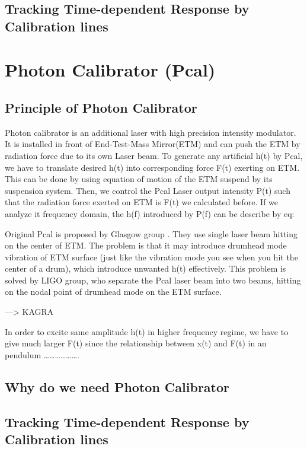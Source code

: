 \subsection{Tracking Time-dependent Response by Calibration lines}



\section{Photon Calibrator (Pcal)}
\subsection{Principle of Photon Calibrator}
Photon calibrator is an additional laser with high precision intensity modulator. It is installed in front of End-Test-Mass Mirror(ETM) and can push the ETM by radiation force due to its own Laser beam. To generate any artificial h(t) by Pcal, we have to translate desired h(t) into corresponding force F(t) exerting on ETM. This can be done by using equation of motion of the ETM suspend by its suspension system. Then, we control the Pcal Laser output intensity P(t) such that the radiation force exerted on ETM is F(t) we calculated before. If we analyze it frequency domain,  the h(f) introduced by P(f) can be describe by eq:

Original Pcal is proposed by Glasgow group \cite{pcal:clubley2001}. They use single laser beam hitting on the center of ETM. The problem is that it may introduce drumhead mode vibration of ETM surface (just like the vibration mode you see when you hit the center of a drum), which introduce unwanted h(t) effectively. This problem is solved by LIGO group\cite{pcal:karki2016}, who separate the Pcal laser beam into two beams, hitting on the nodal point of drumhead mode on the ETM surface\cite{pcal:Daveloza2012}.  

 —> KAGRA

In order to excite same amplitude h(t) in higher frequency regime, we have to give much larger F(t) since the relationship between x(t) and F(t) in an pendulum ……………….



\subsection{Why do we need Photon Calibrator}
\subsection{Tracking Time-dependent Response by Calibration lines}
